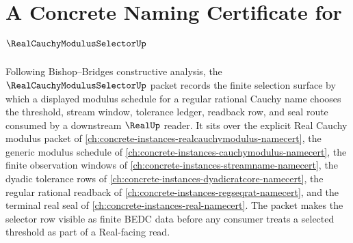 \chapter{A Concrete Naming Certificate for $\RealCauchyModulusSelectorUp$}
\label{ch:concrete-instances-realcauchymodulusselector-namecert}

Following Bishop--Bridges constructive analysis, the $\RealCauchyModulusSelectorUp$ packet records the finite selection surface by which a displayed modulus schedule for a regular rational Cauchy name chooses the threshold, stream window, tolerance ledger, readback row, and seal route consumed by a downstream $\RealUp$ reader. It sits over the explicit Real Cauchy modulus packet of \autoref{ch:concrete-instances-realcauchymodulus-namecert}, the generic modulus schedule of \autoref{ch:concrete-instances-cauchymodulus-namecert}, the finite observation windows of \autoref{ch:concrete-instances-streamname-namecert}, the dyadic tolerance rows of \autoref{ch:concrete-instances-dyadicratcore-namecert}, the regular rational readback of \autoref{ch:concrete-instances-regseqrat-namecert}, and the terminal real seal of \autoref{ch:concrete-instances-real-namecert}. The packet makes the selector row visible as finite BEDC data before any consumer treats a selected threshold as part of a Real-facing read.

